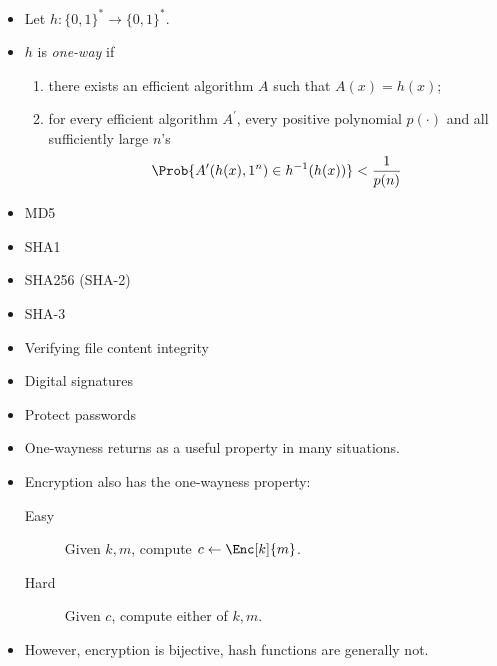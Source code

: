 \begin{frame}
  \begin{definition}
    \begin{itemize}
      \item Let \(h\colon \{0,1\}^*\to \{0,1\}^*\).
      \item \(h\) is \emph{one-way} if
        \begin{enumerate}
          \item there exists an efficient algorithm \(A\) such that \(A(x) 
              = h(x)\);
          \item for every efficient algorithm \(A^\prime\), every positive 
            polynomial \(p(\cdot)\) and all sufficiently large \(n\)'s
            \[\Prob{A^\prime(h(x), 1^n) \in h^{-1}(h(x))} < \frac{1}{p(n)}\]
        \end{enumerate}
    \end{itemize}
  \end{definition}
\end{frame}

\begin{frame}
  \begin{example}
    \begin{itemize}
      \item MD5
      \item SHA1
      \item SHA256 (SHA-2)
      \item SHA-3
    \end{itemize}
  \end{example}
  \begin{example}[Applications]
    \begin{itemize}
      \item Verifying file content integrity
      \item Digital signatures
      \item Protect passwords
    \end{itemize}
  \end{example}
\end{frame}

\begin{frame}
  \begin{remark}
    \begin{itemize}
      \item One-wayness returns as a useful property in many situations.
      \item Encryption also has the one-wayness property:
        \begin{description}
          \item[Easy] Given \(k, m\), compute \(c\gets \Enc[k]{m}\).
          \item[Hard] Given \(c\), compute either of \(k, m\).
        \end{description}
      \item However, encryption is bijective, hash functions are generally not.
    \end{itemize}
  \end{remark}
\end{frame}

